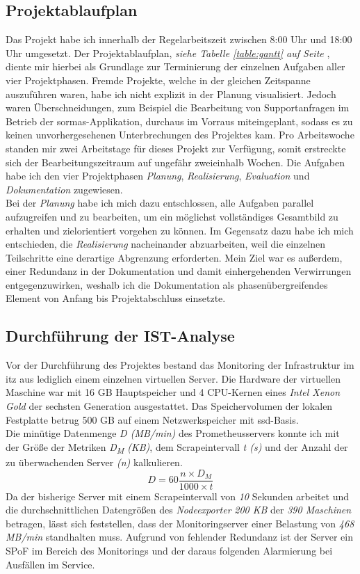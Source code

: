\documentclass[11pt,a4paper]{article}
\begin{document}
\subsection{Projektablaufplan}
Das Projekt habe ich innerhalb der Regelarbeitszeit zwischen 8:00 Uhr und 18:00 Uhr umgesetzt.
Der Projektablaufplan, \emph{siehe Tabelle \ref{table:gantt} auf Seite \pageref{table:gantt}},
diente mir hierbei als Grundlage zur Terminierung der einzelnen Aufgaben aller vier Projektphasen.
Fremde Projekte, welche in der gleichen Zeitspanne auszuführen waren, habe ich nicht explizit in
der Planung visualisiert. Jedoch waren Überschneidungen, zum Beispiel die Bearbeitung
von Supportanfragen im Betrieb der \gls{sormas}-Applikation, durchaus im Vorraus miteingeplant,
sodass es zu keinen unvorhergesehenen Unterbrechungen des Projektes kam. Pro Arbeitswoche standen mir
zwei Arbeitstage für dieses Projekt zur Verfügung, somit erstreckte sich der Bearbeitungszeitraum auf ungefähr
zweieinhalb Wochen. Die Aufgaben habe ich den vier Projektphasen
\emph{Planung}, \emph{Realisierung}, \emph{Evaluation} und \emph{Dokumentation} zugewiesen. \\
Bei der \emph{Planung} habe ich mich dazu entschlossen, alle Aufgaben parallel aufzugreifen und zu bearbeiten,
um ein möglichst vollständiges Gesamtbild zu erhalten und zielorientiert vorgehen zu können.
Im Gegensatz dazu habe ich mich entschieden, die \emph{Realisierung} nacheinander abzuarbeiten, weil
die einzelnen Teilschritte eine derartige Abgrenzung erforderten. Mein Ziel war es außerdem, einer
Redundanz in der Dokumentation und damit einhergehenden Verwirrungen entgegenzuwirken, weshalb ich
die Dokumentation als phasenübergreifendes Element von Anfang bis Projektabschluss einsetzte.
\subsection{Durchführung der IST-Analyse}
\label{ssec:ist}
Vor der Durchführung des Projektes bestand das Monitoring der Infrastruktur im \gls{itz} aus lediglich
einem einzelnen virtuellen Server. Die Hardware der virtuellen Maschine war mit 16 GB Hauptspeicher und 4 CPU-Kernen eines \emph{Intel Xenon Gold}
der sechsten Generation ausgestattet. Das Speichervolumen der lokalen Festplatte betrug 500 GB auf einem Netzwerkspeicher
mit \gls{ssd}-Basis. \\
Die minütige Datenmenge \emph{D (MB/min)} des Prometheusservers konnte ich mit der Größe der Metriken \emph{D\textsubscript{M} (KB)}, dem Scrapeintervall \emph{t (s)} und der Anzahl
der zu überwachenden Server \emph{(n)} kalkulieren.
\begin{equation}
  \nonumber
  D = 60\frac{n \times D_{M}}{1000 \times t}
\end{equation}
Da der bisherige Server mit einem Scrapeintervall von \emph{10} Sekunden arbeitet und die durchschnittlichen
Datengrößen des \emph{Nodeexporter} \emph{200 KB} der \emph{390 Maschinen} betragen, lässt sich
feststellen, dass der Monitoringserver einer Belastung von \emph{468 MB/min} standhalten muss.
Aufgrund von fehlender Redundanz ist der Server ein \gls{SPoF} im Bereich des Monitorings
und der daraus folgenden Alarmierung bei Ausfällen im Service.
\end{document}
